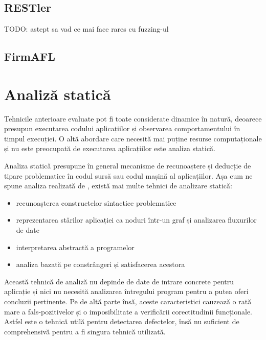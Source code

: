 
\subsection{RESTler}

TODO: astept sa vad ce mai face rares cu fuzzing-ul



\subsection{FirmAFL}


\section{Analiză statică}

Tehnicile anterioare evaluate pot fi toate considerate dinamice în natură, deoarece presupun executarea codului aplicațiilor și observarea comportamentului în timpul execuției. O altă abordare care necesită mai puține resurse computaționale și nu este preocupată de executarea aplicațiilor este analiza statică. 

Analiza statică presupune în general mecanisme de recunoaștere și deducție de tipare problematice în codul sursă sau codul mașină al aplicațiilor. Așa cum ne spune analiza realizată de \cite{Gosain2015}, există mai multe tehnici de analizare statică:
\begin{itemize}
    \item recunoașterea constructelor sintactice problematice
    \item reprezentarea stărilor aplicației ca noduri într-un graf și analizarea fluxurilor de date
    \item interpretarea abstractă a programelor
    \item analiza bazată pe constrângeri și satisfacerea acestora
\end{itemize}

Această tehnică de analiză nu depinde de date de intrare concrete pentru aplicație și nici nu necesită analizarea întregului program pentru a putea oferi concluzii pertinente. Pe de altă parte însă, aceste caracteristici cauzează o rată mare a fals-pozitivelor și o imposibilitate a verificării corectitudinii funcționale. Astfel este o tehnică utilă pentru detectarea defectelor, însă nu suficient de comprehensivă pentru a fi singura tehnică utilizată.

